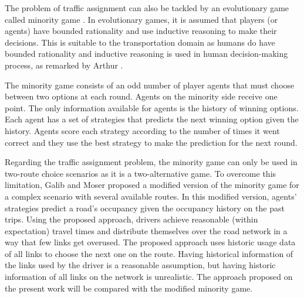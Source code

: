 \documentclass{RITA}
\begin{document}
The problem of traffic assignment can also be tackled by an evolutionary game called minority game \cite{Challet&Zhang1997}. In evolutionary games, it is assumed that players (or agents) have bounded rationality and use inductive reasoning to make their decisions. This is suitable to the transportation domain as humans do have bounded rationality and inductive reasoning is used in human decision-making process, as remarked by Arthur \cite{Arthur1994}.

The minority game consists of an odd number of player agents that must choose between two options at each round. Agents on the minority side receive one point. The only information available for agents is the history of winning options. Each agent has a set of strategies that predicts the next winning option given the history. Agents score each strategy according to the number of times it went correct and they use the best strategy to make the prediction for the next round.

Regarding the traffic assignment problem, the minority game can only be used in two-route choice scenarios as it is a two-alternative game. To overcome this limitation, Galib and Moser \cite{Galib&Moser2011} proposed a modified version of the minority game for a complex scenario with several available routes. In this modified version, agents' strategies predict a road's occupancy given the occupancy history on the past trips. Using the proposed approach, drivers achieve reasonable (within expectation) travel times and distribute themselves over the road network in a way that few links get overused. The proposed approach uses historic usage data of all links to choose the next one on the route. Having historical information of the links used by the driver is a reasonable assumption, but having historic information of all links on the network is unrealistic. The approach proposed on the present work will be compared with the modified minority game. 

\end{document}
